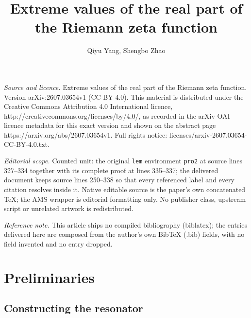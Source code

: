 \documentclass[10pt,a4paper]{amsart}
\numberwithin{equation}{section}
\begin{document}
\title[Extreme values of the real part of the Riemann zeta function]{Extreme values of the real part of the Riemann zeta function}
\author{Qiyu Yang, Shengbo Zhao}
\date{}
\maketitle
\noindent\emph{Source and licence.} Extreme values of the real part of the Riemann zeta function. Version arXiv:2607.03654v1 (CC BY 4.0). This material is distributed under the Creative Commons Attribution 4.0 International licence, http://creativecommons.org/licenses/by/4.0/, as recorded in the arXiv OAI licence metadata for this exact version and shown on the abstract page https://arxiv.org/abs/2607.03654v1. Full rights notice: licenses/arxiv-2607.03654-CC-BY-4.0.txt.\par\smallskip
\noindent\textit{Editorial scope.} Counted unit: the original \texttt{lem} environment \texttt{pro2} at source lines 327--334 together with its complete proof at lines 335--337; the delivered document keeps source lines 250--338 so that every referenced label and every citation resolves inside it. Native editable source is the paper's own concatenated TeX; the AMS wrapper is editorial formatting only. No publisher class, upstream script or unrelated artwork is redistributed.
\par\smallskip\noindent\textit{Reference note.} This article ships no compiled bibliography (biblatex); the entries delivered here are composed from the author's own BibTeX (.bib) fields, with no field invented and no entry dropped.
\section{Preliminaries}
\label{secpre}

\subsection{Constructing the resonator}
\label{secConstucting}
\end{document}
